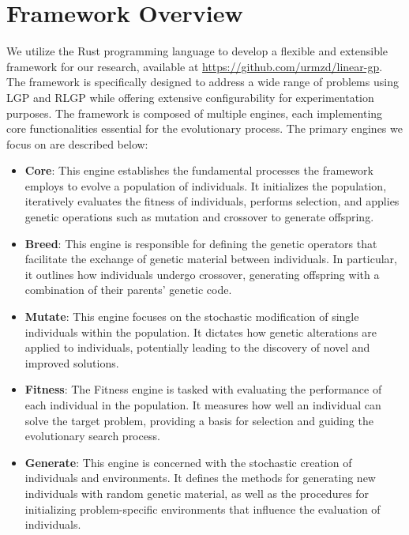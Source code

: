 \documentclass[12pt, final]{dalcsthesis}
\begin{document}
\section{Framework Overview}
We utilize the Rust programming language to develop a flexible and extensible framework for our research, available at \url{https://github.com/urmzd/linear-gp}. The framework is specifically designed to address a wide range of problems using LGP and RLGP while offering extensive configurability for experimentation purposes. The framework is composed of multiple engines, each implementing core functionalities essential for the evolutionary process. The primary engines we focus on are described below:

\begin{itemize}
	\item \textbf{Core}: This engine establishes the fundamental processes the framework employs to evolve a population of individuals. It initializes the population, iteratively evaluates the fitness of individuals, performs selection, and applies genetic operations such as mutation and crossover to generate offspring.

	\item \textbf{Breed}: This engine is responsible for defining the genetic operators that facilitate the exchange of genetic material between individuals. In particular, it outlines how individuals undergo crossover, generating offspring with a combination of their parents' genetic code.

	\item \textbf{Mutate}: This engine focuses on the stochastic modification of single individuals within the population. It dictates how genetic alterations are applied to individuals, potentially leading to the discovery of novel and improved solutions.

	\item \textbf{Fitness}: The Fitness engine is tasked with evaluating the performance of each individual in the population. It measures how well an individual can solve the target problem, providing a basis for selection and guiding the evolutionary search process.

	\item \textbf{Generate}: This engine is concerned with the stochastic creation of individuals and environments. It defines the methods for generating new individuals with random genetic material, as well as the procedures for initializing problem-specific environments that influence the evaluation of individuals.
\end{itemize}
\end{document}
